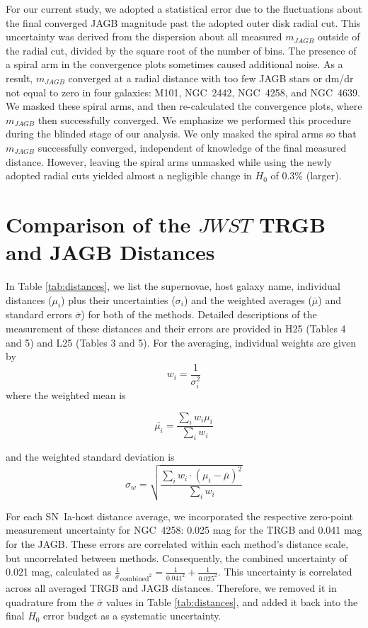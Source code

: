 \documentclass[12pt,modern]{aastex631}
\newcommand{\ho}{$H_{0}$\xspace}
\newcommand{\sn}{SN~Ia\xspace}
\newcommand{\ngc}{NGC\,\xspace}
\begin{document}
For our current study, we adopted a statistical error due to the fluctuations about the final converged JAGB magnitude past the adopted outer disk radial cut. This uncertainty was derived from the dispersion about all measured $m_{JAGB}$ outside of the radial cut, divided by the square root of the number of bins. The presence of a spiral arm in the convergence plots sometimes caused additional noise. As a result,  $m_{JAGB}$  converged at a radial distance with too few JAGB stars or dm/dr not equal to zero in four galaxies: M101, \ngc 2442, \ngc 4258, and \ngc 4639. We masked these spiral arms, and then re-calculated the convergence plots, where $m_{JAGB}$ then successfully converged. We emphasize we performed this procedure during the blinded stage of our analysis. We only masked the spiral arms so that $m_{JAGB}$ successfully converged, independent of knowledge of the final measured distance. However, leaving the spiral arms unmasked while using the newly adopted radial cuts yielded almost a negligible change in \ho  of 0.3\% (larger).



\section{Comparison of the $JWST$ TRGB and JAGB Distances}
\label{sec:comparison}


In Table \ref{tab:distances}, we list the supernovae, host galaxy name, individual distances ($\mu_i$) plus their uncertainties ($\sigma_i$) and  the weighted averages ($\bar{\mu}$) and standard errors $\bar{\sigma}$) for both of the methods. Detailed descriptions of the measurement of these distances and their errors are provided in  H25 (Tables 4 and 5) and L25 (Tables 3 and 5). For the averaging, individual weights are given by  $$w_i = \frac{1}{\sigma_i^2}$$ 
where the weighted mean is 

$$
\bar{\mu _i} = \frac{\sum_{i} w_i \mu_i}{\sum_{i} w_i} 
$$

\noindent
and the weighted standard deviation is 
$$
\sigma_w = \sqrt{\frac{\sum_{i} w_i \cdot (\mu_i - \bar{ \mu })^2}{\sum_{i} w_i}}
$$

 \noindent

For each \sn-host distance average, we incorporated the respective zero-point measurement uncertainty for \ngc 4258: 0.025 mag for the TRGB and 0.041 mag for the JAGB. These errors are correlated  within each method’s distance scale, but uncorrelated  between methods. Consequently, the combined uncertainty of  0.021 mag, calculated as   
 $\frac{1}\sigma_{\text{combined}^2} = \frac{1}{0.041^2} + \frac{1}{0.025^2}$.
 This uncertainty is correlated across all averaged TRGB and JAGB distances. Therefore, we removed it in quadrature from the $\bar{\sigma}$ values in Table \ref{tab:distances}, and  added it back into the final \ho error budget  as a systematic uncertainty. 
\end{document}
